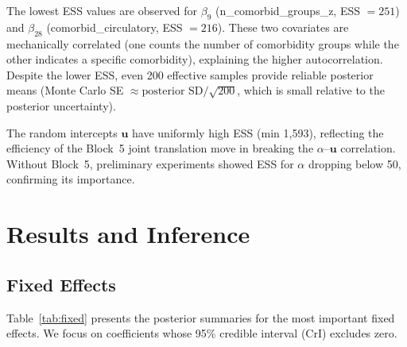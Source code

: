 \documentclass[10pt]{article}
\newcommand{\bu}{\bm{u}}
\begin{document}
The lowest ESS values are observed for $\beta_9$ (n\_comorbid\_groups\_z,
ESS $= 251$) and $\beta_{28}$ (comorbid\_circulatory, ESS $= 216$).
These two covariates are mechanically correlated (one counts the number of
comorbidity groups while the other indicates a specific comorbidity), explaining
the higher autocorrelation.  Despite the lower ESS, even 200 effective samples
provide reliable posterior means (Monte Carlo SE $\approx \text{posterior SD} /
\sqrt{200}$, which is small relative to the posterior uncertainty).

The random intercepts $\bu$ have uniformly high ESS (min 1,593), reflecting
the efficiency of the Block~5 joint translation move in breaking the
$\alpha$--$\bu$ correlation.  Without Block~5, preliminary experiments showed
ESS for $\alpha$ dropping below 50, confirming its importance.

\section{Results and Inference}
\label{sec:results}

\subsection{Fixed Effects}

Table~\ref{tab:fixed} presents the posterior summaries for the most important
fixed effects.  We focus on coefficients whose 95\% credible interval (CrI)
excludes zero.
\end{document}
